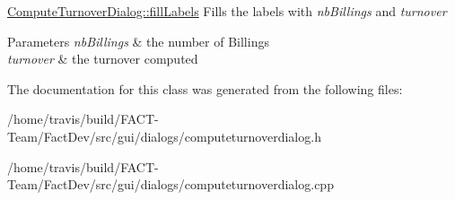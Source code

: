 \hyperlink{classGui_1_1Dialogs_1_1ComputeTurnoverDialog_a34de3e4d4504108ad4954a64b4101546}{Compute\-Turnover\-Dialog\-::fill\-Labels} Fills the labels with {\itshape nb\-Billings} and {\itshape turnover} 


\begin{DoxyParams}{Parameters}
{\em nb\-Billings} & the number of Billings \\
\hline
{\em turnover} & the turnover computed \\
\hline
\end{DoxyParams}


The documentation for this class was generated from the following files\-:\begin{DoxyCompactItemize}
\item 
/home/travis/build/\-F\-A\-C\-T-\/\-Team/\-Fact\-Dev/src/gui/dialogs/computeturnoverdialog.\-h\item 
/home/travis/build/\-F\-A\-C\-T-\/\-Team/\-Fact\-Dev/src/gui/dialogs/computeturnoverdialog.\-cpp\end{DoxyCompactItemize}
